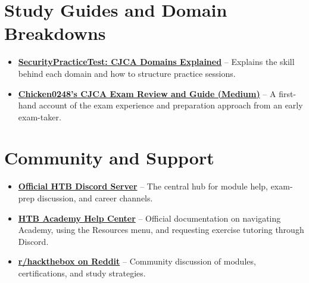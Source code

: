 \documentclass[11pt,letterpaper]{article}
\begin{document}
\section{Study Guides and Domain Breakdowns}
\begin{itemize}
\item \textbf{\href{https://securitypracticetest.com/hack-the-box-htb-certified-junior-cybersecurity-associate-htb-cjca-domains-explained-what-to-study-practice-and-review/}{SecurityPracticeTest: CJCA Domains Explained}} -- Explains the skill behind each domain and how to structure practice sessions.
\item \textbf{\href{https://medium.com/@chaoskist/your-first-definitive-guide-and-review-on-hackthebox-cjca-certification-exam-9606474a91bc}{Chicken0248's CJCA Exam Review and Guide (Medium)}} -- A first-hand account of the exam experience and preparation approach from an early exam-taker.
\end{itemize}

\section{Community and Support}
\begin{itemize}
\item \textbf{\href{https://discord.com/invite/hackthebox}{Official HTB Discord Server}} -- The central hub for module help, exam-prep discussion, and career channels.
\item \textbf{\href{https://help.hackthebox.com/en/articles/12256202-introduction-to-htb-academy}{HTB Academy Help Center}} -- Official documentation on navigating Academy, using the Resources menu, and requesting exercise tutoring through Discord.
\item \textbf{\href{https://www.reddit.com/r/hackthebox/}{r/hackthebox on Reddit}} -- Community discussion of modules, certifications, and study strategies.
\end{itemize}
\end{document}
